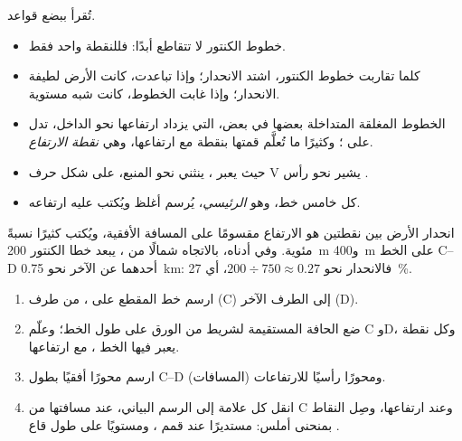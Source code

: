 تُقرأ  ببضع قواعد.
\begin{itemize}
  \item خطوط الكنتور لا تتقاطع أبدًا: فللنقطة  واحد فقط.
  \item كلما تقاربت خطوط الكنتور، اشتد الانحدار؛ وإذا تباعدت، كانت الأرض
        لطيفة الانحدار؛ وإذا غابت الخطوط، كانت شبه مستوية.
  \item الخطوط المغلقة المتداخلة بعضها في بعض، التي يزداد ارتفاعها نحو
        الداخل، تدل على ؛ وكثيرًا ما تُعلَّم قمتها بنقطة مع ارتفاعها،
        وهي \emph{نقطة الارتفاع}.
  \item حيث يعبر  ، ينثني نحو المنبع، على شكل حرف V
        يشير نحو رأس .
  \item كل خامس خط، وهو \emph{ الرئيسي}، يُرسم أغلظ ويُكتب
        عليه ارتفاعه.
\end{itemize}

انحدار الأرض بين نقطتين هو الارتفاع مقسومًا على المسافة الأفقية، ويُكتب
كثيرًا نسبةً مئوية. وفي  أدناه، بالاتجاه شمالًا من ، يبعد
خطا الكنتور \qty{200}{m} و\qty{400}{m} على الخط C--D أحدهما عن الآخر
نحو \qty{0.75}{km}: فالانحدار نحو $200 \div 750
\approx 0.27$، أي \qty{27}{\%}.

\begin{method}
\begin{enumerate}
  \item ارسم خط المقطع على ، من طرف (C) إلى الطرف
        الآخر (D).
  \item ضع الحافة المستقيمة لشريط من الورق على طول الخط؛ وعلّم C وD،
        وكل نقطة يعبر فيها الخط ، مع
        ارتفاعها.
  \item ارسم محورًا أفقيًا بطول C--D (المسافات) ومحورًا رأسيًا
        للارتفاعات.
  \item انقل كل علامة إلى الرسم البياني، عند مسافتها من C وعند
        ارتفاعها، وصِل النقاط بمنحنى أملس: مستديرًا عند قمم ،
        ومستويًا على طول قاع .
\end{enumerate}
\end{method}

